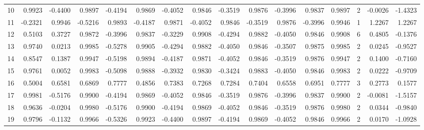 \begin{tabular}{lrrrrrrrrrrrrrrr}
10 &      0.9923 & -0.4400 &  0.9897 & -0.4194 &  0.9869 & -0.4052 &  0.9846 & -0.3519 &  0.9876 & -0.3996 &   0.9837 &     0.9897 &      2 &                   -0.0026 &                    -1.4323 \\
11 &     -0.2321 &  0.9946 & -0.5216 &  0.9893 & -0.4187 &  0.9871 & -0.4052 &  0.9846 & -0.3519 &  0.9876 &  -0.3996 &     0.9946 &      1 &                    1.2267 &                     1.2267 \\
12 &      0.5103 &  0.3727 &  0.9872 & -0.3996 &  0.9837 & -0.3229 &  0.9908 & -0.4294 &  0.9882 & -0.4050 &   0.9846 &     0.9908 &      6 &                    0.4805 &                    -0.1376 \\
13 &      0.9740 &  0.0213 &  0.9985 & -0.5278 &  0.9905 & -0.4294 &  0.9882 & -0.4050 &  0.9846 & -0.3507 &   0.9875 &     0.9985 &      2 &                    0.0245 &                    -0.9527 \\
14 &      0.8547 &  0.1387 &  0.9947 & -0.5198 &  0.9894 & -0.4187 &  0.9871 & -0.4052 &  0.9846 & -0.3519 &   0.9876 &     0.9947 &      2 &                    0.1400 &                    -0.7160 \\
15 &      0.9761 &  0.0052 &  0.9983 & -0.5098 &  0.9888 & -0.3932 &  0.9830 & -0.3424 &  0.9883 & -0.4050 &   0.9846 &     0.9983 &      2 &                    0.0222 &                    -0.9709 \\
16 &      0.5004 &  0.6581 &  0.6869 &  0.7777 &  0.4856 &  0.7383 &  0.7268 &  0.7284 &  0.7404 &  0.6558 &   0.6951 &     0.7777 &      3 &                    0.2773 &                     0.1577 \\
17 &      0.9981 & -0.5176 &  0.9900 & -0.4194 &  0.9869 & -0.4052 &  0.9846 & -0.3519 &  0.9876 & -0.3996 &   0.9837 &     0.9900 &      2 &                   -0.0081 &                    -1.5157 \\
18 &      0.9636 & -0.0204 &  0.9980 & -0.5176 &  0.9900 & -0.4194 &  0.9869 & -0.4052 &  0.9846 & -0.3519 &   0.9876 &     0.9980 &      2 &                    0.0344 &                    -0.9840 \\
19 &      0.9796 & -0.1132 &  0.9966 & -0.5326 &  0.9923 & -0.4400 &  0.9897 & -0.4194 &  0.9869 & -0.4052 &   0.9846 &     0.9966 &      2 &                    0.0170 &                    -1.0928 \\
\bottomrule
\end{tabular}
